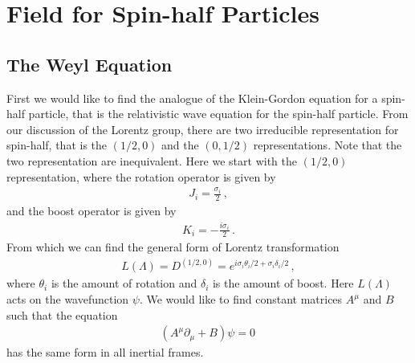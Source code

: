 \documentclass[11pt, onesided]{book}
\theoremstyle{break}
\theoremstyle{break}
\newcommand{\pd}{\partial}
\begin{document}
\chapter{Field for Spin-half Particles}
\section[The Weyl Equation]{\color{red}The Weyl Equation\color{black}}
First we would like to find the analogue of the Klein-Gordon equation for a spin-half particle, that is the relativistic wave equation for the spin-half particle. From our discussion of the Lorentz group, there are two irreducible representation for spin-half, that is the $(1/2,0)$ and the $(0,1/2)$ representations. Note that the two representation are inequivalent. Here we start with the $(1/2,0)$ representation, where the rotation operator is given by
\begin{align*}
J_i = \frac{\sigma_i}{2}\,,
\end{align*}
and the boost operator is given by
\begin{align*}
K_i = -\frac{i\sigma_i}{2}\,.
\end{align*}
From which we can find the general form of Lorentz transformation
\begin{align*}
L(\Lambda) = D^{(1/2,0)} = e^{i\sigma_i \theta_i /2 + \sigma_i \delta_i / 2}\,,
\end{align*}
where $\theta_i$ is the amount of rotation and $\delta_i$ is the amount of boost. Here $L(\Lambda)$ acts on the wavefunction $\psi$. We would like to find constant matrices $A^\mu$ and $B$ such that the equation
\begin{align}
(A^\mu \pd_\mu + B ) \psi = 0\,
\end{align}
has the same form in all inertial frames. \\
\end{document}
